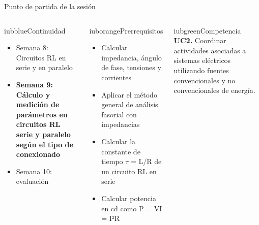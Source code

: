 \documentclass[aspectratio=169,11pt,xcolor={table}]{beamer}
\begin{document}
\begin{frame}{Punto de partida de la sesión}
\begin{columns}[T,onlytextwidth]
\begin{caja}[height=5.9cm]{iubblue}{Continuidad}
\scriptsize \begin{itemize}\setlength{\itemsep}{2pt}
  \item Semana 8: Circuitos RL en serie y en paralelo
  \item \textbf{Semana 9: Cálculo y medición de parámetros en circuitos RL serie y paralelo según el tipo de conexionado}
  \item Semana 10: evaluación
\end{itemize}
\end{caja}
\begin{caja}[height=5.9cm]{iuborange}{Prerrequisitos}
\scriptsize \begin{itemize}\setlength{\itemsep}{2pt}
  \item Calcular impedancia, ángulo de fase, tensiones y corrientes
  \item Aplicar el método general de análisis fasorial con impedancias
  \item Calcular la constante de tiempo \ensuremath{\tau} = L/R de un circuito RL en serie
  \item Calcular potencia en cd como P = VI = I²R
\end{itemize}
\end{caja}
\begin{caja}[height=5.9cm]{iubgreen}{Competencia}
\scriptsize \textbf{UC2.} Coordinar actividades asociadas a sistemas eléctricos utilizando fuentes convencionales y no convencionales de energía.
\end{caja}
\end{columns}
\end{frame}
\end{document}
